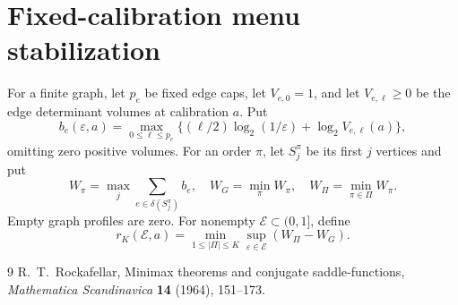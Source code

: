 \section{Fixed-calibration menu stabilization}
For a finite graph, let $p_e$ be fixed edge caps, let $V_{e,0}=1$,
and let $V_{e,\ell}\ge0$ be the edge determinant volumes at calibration
$a$. Put
\[
 b_e(\varepsilon,a)=\max_{0\le\ell\le p_e}
 \{(\ell/2)\log_2(1/\varepsilon)+\log_2V_{e,\ell}(a)\},
\]
omitting zero positive volumes. For an order $\pi$, let $S_j^\pi$ be
its first $j$ vertices and put
\[
 W_\pi=\max_j\sum_{e\in\delta(S_j^\pi)}b_e,\quad
 W_G=\min_\pi W_\pi,\quad W_\Pi=\min_{\pi\in\Pi}W_\pi.
\]
Empty graph profiles are zero. For nonempty $\mathcal E\subset(0,1]$,
define
\[
 r_K(\mathcal E,a)=\min_{1\le|\Pi|\le K}
 \sup_{\varepsilon\in\mathcal E}(W_\Pi-W_G).
\]



\begin{thebibliography}{9}
R.~T.~Rockafellar, Minimax theorems and conjugate saddle-functions,
\emph{Mathematica Scandinavica} \textbf{14} (1964), 151--173.
\end{thebibliography}

